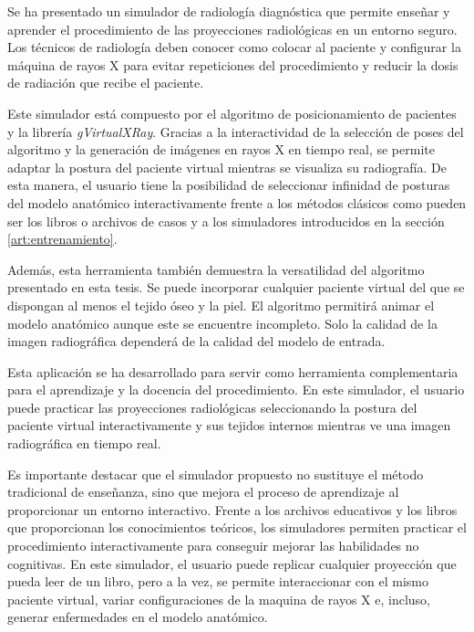 Se ha presentado un simulador de radiología diagnóstica que permite enseñar y aprender el procedimiento de las proyecciones radiológicas en un entorno seguro. Los técnicos de radiología deben conocer como colocar al paciente y configurar la máquina de rayos X para evitar repeticiones del procedimiento y reducir la dosis de radiación que recibe el paciente.

Este simulador está compuesto por el algoritmo de posicionamiento de pacientes y la librería \emph{gVirtualXRay}. Gracias a la interactividad de la selección de poses del algoritmo y la generación de imágenes en rayos X en tiempo real, se permite adaptar la postura del paciente virtual mientras se visualiza su radiografía. De esta manera, el usuario tiene la posibilidad de seleccionar infinidad de posturas del modelo anatómico interactivamente frente a los métodos clásicos como pueden ser los libros o archivos de casos y a los simuladores introducidos en la sección \ref{art:entrenamiento}.

Además, esta herramienta también demuestra la versatilidad del algoritmo presentado en esta tesis. Se puede incorporar cualquier paciente virtual del que se dispongan al menos el tejido óseo y la piel. El algoritmo permitirá animar el modelo anatómico aunque este se encuentre incompleto. Solo la calidad de la imagen radiográfica dependerá de la calidad del modelo de entrada.

Esta aplicación se ha desarrollado para servir como herramienta complementaria para el aprendizaje y la docencia del procedimiento. %
En este simulador, el usuario puede practicar las proyecciones radiológicas seleccionando la postura del paciente virtual interactivamente y sus tejidos internos mientras ve una imagen radiográfica en tiempo real. 

Es importante destacar que el simulador propuesto no sustituye el método tradicional de enseñanza, sino que mejora el proceso de aprendizaje al proporcionar un entorno interactivo. Frente a los archivos educativos y los libros que proporcionan los conocimientos teóricos, los simuladores permiten practicar el procedimiento interactivamente para conseguir mejorar las habilidades no cognitivas. En este simulador, el usuario puede replicar cualquier proyección que pueda leer de un libro, pero a la vez, se permite interaccionar con el mismo paciente virtual, variar configuraciones de la maquina de rayos X e, incluso, generar enfermedades en el modelo anatómico.

